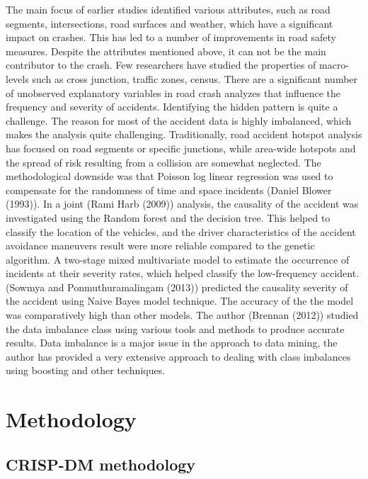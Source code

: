 \documentclass[
  a4paper,
]{article}
\begin{document}
The main focus of earlier studies identified various attributes, such as
road segments, intersections, road surfaces and weather, which have a
significant impact on crashes. This has led to a number of improvements
in road safety measures. Despite the attributes mentioned above, it can
not be the main contributor to the crash. Few researchers have studied
the properties of macro-levels such as cross junction, traffic zones,
census. There are a significant number of unobserved explanatory
variables in road crash analyzes that influence the frequency and
severity of accidents. Identifying the hidden pattern is quite a
challenge. The reason for most of the accident data is highly
imbalanced, which makes the analysis quite challenging. Traditionally,
road accident hotspot analysis has focused on road segments or specific
junctions, while area-wide hotspots and the spread of risk resulting
from a collision are somewhat neglected. The methodological downside was
that Poisson log linear regression was used to compensate for the
randomness of time and space incidents (Daniel Blower (1993)). In a
joint (Rami Harb (2009)) analysis, the causality of the accident was
investigated using the Random forest and the decision tree. This helped
to classify the location of the vehicles, and the driver characteristics
of the accident avoidance maneuvers result were more reliable compared
to the genetic algorithm. A two-stage mixed multivariate model to
estimate the occurrence of incidents at their severity rates, which
helped classify the low-frequency accident. (Sowmya and
Ponmuthuramalingam (2013)) predicted the causality severity of the
accident using Naive Bayes model technique. The accuracy of the the
model was comparatively high than other models. The author (Brennan
(2012)) studied the data imbalance class using various tools and methods
to produce accurate results. Data imbalance is a major issue in the
approach to data mining, the author has provided a very extensive
approach to dealing with class imbalances using boosting and other
techniques.

\newpage

\hypertarget{methodology}{%
\section{Methodology}\label{methodology}}

\hypertarget{crisp-dm-methodology}{%
\subsection{CRISP-DM methodology}\label{crisp-dm-methodology}}
\end{document}
